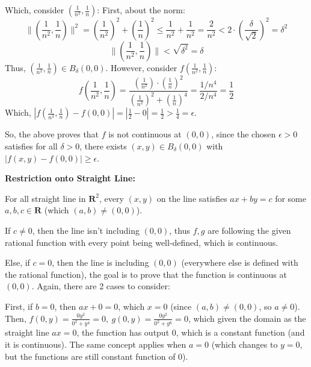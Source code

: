 \documentclass{article}
\begin{document}
\begin{itemize}
    Which, consider $(\frac{1}{n^2},\frac{1}{n})$:
    First, about the norm:
    $$\|(\frac{1}{n^2},\frac{1}{n})\|^2 = (\frac{1}{n^2})^2+(\frac{1}{n})^2 \leq \frac{1}{n^2}+\frac{1}{n^2} = \frac{2}{n^2} < 2\cdot (\frac{\delta}{\sqrt{2}})^2 = \delta^2 $$
    $$\|(\frac{1}{n^2},\frac{1}{n})\| < \sqrt{\delta^2} = \delta$$
    Thus, $(\frac{1}{n^2},\frac{1}{n})\in B_\delta(0,0)$. However, consider $f(\frac{1}{n^2},\frac{1}{n})$:
    $$f(\frac{1}{n^2},\frac{1}{n}) = \frac{(\frac{1}{n^2})\cdot(\frac{1}{n})^2}{(\frac{1}{n^2})^2+(\frac{1}{n})^4} = \frac{1/n^4}{2/n^4} = \frac{1}{2}$$
    Which, $|f(\frac{1}{n^2},\frac{1}{n})-f(0,0)| = |\frac{1}{2}-0| = \frac{1}{2} > \frac{1}{4} = \epsilon$. 

    So, the above proves that $f$ is not continuous at $(0,0)$, since the chosen $\epsilon>0$ satisfies for all $\delta>0$, there exists $(x,y)\in B_\delta(0,0)$ with $|f(x,y)-f(0,0)| \geq \epsilon$.

    \hfill

    \textbf{Restriction onto Straight Line:}
    
    For all straight line in $\mathbf{R}^2$, every $(x,y)$ on the line satisfies $ax+by=c$ for some $a,b,c\in\mathbf{R}$ (which $(a,b)\neq (0,0)$).

    If $c\neq 0$, then the line isn't including $(0,0)$, thus $f,g$ are following the given rational function with every point being well-defined, which is continuous.

    Else, if $c=0$, then the line is including $(0,0)$ (everywhere else is defined with the rational function), the goal is to prove that the function is continuous at $(0,0)$. Again, there are 2 cases to consider:

    First, if $b=0$, then $ax+0=0$, which $x=0$ (since $(a,b)\neq (0,0)$, so $a\neq 0$). Then, $f(0,y) = \frac{0y^2}{0^2+y^4}=0,\ g(0,y) = \frac{0y^2}{0^2+y^6}=0$, which given the domain as the straight line $ax=0$, the function has output $0$, which is a constant function (and it is continuous). The same concept applies when $a=0$ (which changes to $y=0$, but the functions are still constant function of $0$).


\end{itemize}
\end{document}

